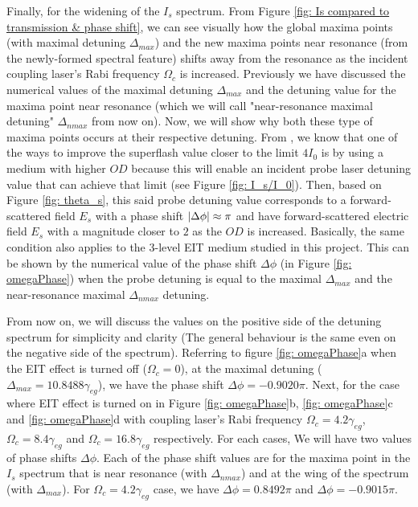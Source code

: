 Finally, for the widening of the $I_{s}$ spectrum. From Figure \ref{fig: Is compared to transmission & phase shift}, we can see visually how the global maxima points (with maximal detuning $\Delta_{max}$) and the new maxima points near resonance (from the newly-formed spectral feature) shifts away from the resonance as the incident coupling laser's Rabi frequency $\Omega_{c}$ is increased. Previously we have discussed the numerical values of the maximal detuning $\Delta_{max}$ and the detuning value for the maxima point near resonance (which we will call "near-resonance maximal detuning" $\Delta_{nmax}$ from now on). Now, we will show why both these type of maxima points occurs at their respective detuning. From , we know that one of the ways to improve the superflash value closer to the limit $4I_{0}$ is by using a medium with higher $OD$ because this will enable an incident probe laser detuning value that can achieve that limit (see Figure \ref{fig: I_s/I_0}). Then, based on Figure \ref{fig: theta_s}, this said probe detuning value corresponds to a forward-scattered field $E_{s}$ with a phase shift $\abs{\Delta\phi} \approx \pi$ and have forward-scattered electric field $E_{s}$ with a magnitude closer to $2$ as the $OD$ is increased. Basically, the same condition also applies to the 3-level EIT medium studied in this project. This can be shown by the numerical value of the phase shift $\Delta\phi$  (in Figure \ref{fig: omegaPhase}) when the probe detuning is equal to the maximal $\Delta_{max}$ and the near-resonance maximal $\Delta_{nmax}$ detuning.

From now on, we will discuss the values on the positive side of the detuning spectrum for simplicity and clarity (The general behaviour is the same even on the negative side of the spectrum). Referring to figure \ref{fig: omegaPhase}a when the EIT effect is turned off ($\Omega_{c} = 0$), at the maximal detuning ($\Delta_{max} = 10.8488\gamma_{eg}$), we have the phase shift $\Delta\phi = -0.9020\pi$. Next, for the case where EIT effect is turned on in Figure \ref{fig: omegaPhase}b, \ref{fig: omegaPhase}c and \ref{fig: omegaPhase}d with coupling laser's Rabi frequency $\Omega_{c} = 4.2\gamma_{eg}$, $\Omega_{c} = 8.4\gamma_{eg}$ and $\Omega_{c} = 16.8\gamma_{eg}$ respectively. For each cases, We will have two values of phase shifts $\Delta\phi$. Each of the phase shift values are for the maxima point in the $I_{s}$ spectrum that is near resonance (with $\Delta_{nmax}$) and at the wing of the spectrum (with $\Delta_{max}$). For $\Omega_{c} = 4.2\gamma_{eg}$ case, we have $\Delta\phi = 0.8492\pi$ and $\Delta\phi = -0.9015\pi$.  

